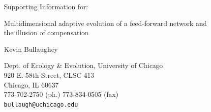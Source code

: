 \documentclass[pdftex,12pt,titlepage]{article}
\date{}
\begin{document}
\setlength{\parindent}{0cm}

\begin{center}
\large Supporting Information for:

\vspace{1cm}

\Large Multidimensional adaptive evolution of a feed-forward network and\\the illusion of compensation

\vspace{1cm}

\normalsize
Kevin Bullaughey

\vspace{1cm}

Dept. of Ecology \& Evolution, University of Chicago \\ 
920 E. 58th Street, CLSC 413\\ 
Chicago, IL 60637 \\ 
773-702-2750 (ph.)  773-834-0505 (fax)  \\ 

\texttt{bullaugh@uchicago.edu}
\end{center}

\raggedright
{}
\clearpage
\end{document}
